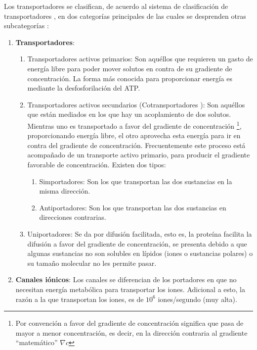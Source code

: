 Los transportadores se clasifican, de acuerdo al sistema de clasificaci\'{o}n de transportadores \cite{Nelson2011}, en dos categor\'{i}as principales de las cuales se desprenden otras subcategor\'{i}as :
\begin{enumerate}
 \item \textbf{Transportadores}:
 \begin{enumerate}
 \item[1.] Transportadores activos primarios: Son aqu\'{e}llos que requieren un gasto de energ\'{i}a libre para poder mover solutos en contra de su gradiente de concentraci\'{o}n. La forma m\'{a}s conocida para proporcionar energ\'{i}a es mediante la desfosforilaci\'{o}n del ATP.
 \item[2.a] Transportadores activos secundarios (Cotransportadores \cite{Nelson2011}): Son aqu\'{e}llos que est\'{a}n mediados en los que hay un acoplamiento de dos solutos. Mientras uno es transportado a favor del gradiente de concentraci\'{o}n \footnote{Por convenci\'{o}n a favor del gradiente de concentraci\'{o}n significa que pasa de mayor a menor concentraci\'{o}n, es decir, en la direcci\'{o}n contraria al gradiente ``matem\'{a}tico'' $\nabla c$}, proporcionando energ\'{i}a libre, el otro aprovecha esta energ\'{i}a para ir en contra del gradiente de concentraci\'{o}n. Frecuentemente este proceso est\'{a} acompa\~{n}ado de un transporte activo primario, para producir el gradiente favorable de concentraci\'{o}n. Existen dos tipos:
  \begin{enumerate}
 \item[a)] Simportadores: Son los que transportan las dos sustancias en la misma direcci\'{o}n.
 \item[b)] Antiportadores: Son los que transportan las dos sustancias en direcciones contrarias.
 \end{enumerate}
 \item[2.b] Uniportadores: Se da por difusi\'{o}n facilitada, esto es, la prote\'{i}na facilita la difusi\'{o}n a favor del gradiente de concentraci\'{o}n, se presenta debido a que algunas sustancias no son solubles en l\'{i}pidos (iones o sustancias polares) o su tama\~{n}o molecular no les permite pasar.
 \end{enumerate}
 \item  \textbf{Canales i\'{o}nicos}: Los canales se diferencian de los portadores en que no necesitan energ\'{i}a metab\'{o}lica para transportar los iones. Adicional a esto, la raz\'{o}n a la que transportan los iones, es de $10^6$ iones/segundo  (muy alta).
 \end{enumerate}


